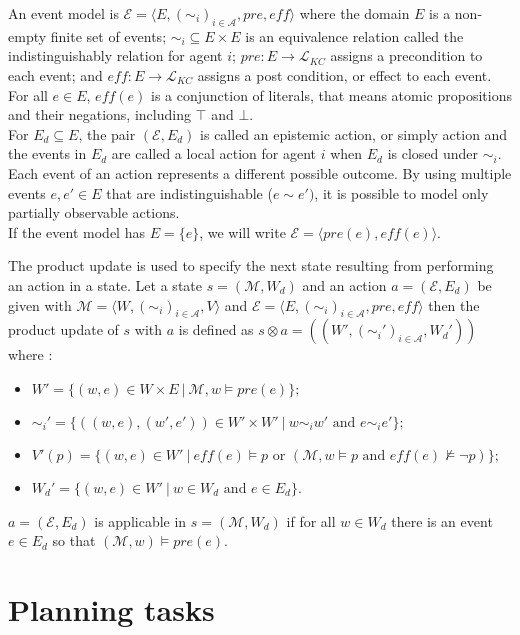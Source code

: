 An event model is $\mathcal{E} = \langle E, (\sim_i)_{i\in \mathcal{A}}, pre, \textit{eff}  \rangle$ where the domain $E$ is a non-empty finite set of events; $\sim_i \subseteq E \times E$ is an equivalence relation called the indistinguishably relation for agent $i$;
$pre:E \rightarrow \mathcal{L}_{KC}$ assigns a precondition to each event;
and $\textit{eff}:E \rightarrow \mathcal{L}_{KC}$ assigns a post condition, or effect to each event.
For all $e\in E$, $\textit{eff}(e)$ is a conjunction of literals, that means atomic propositions and their negations, including $\top$ and $\bot$.\\
For $E_d \subseteq E$, the pair $(\mathcal{E}, E_d)$ is called an epistemic action, or simply action and the events in $E_d$ are called a local action for agent $i$ when $E_d$ is closed under $\sim_i$. \\
Each event of an action represents a different possible outcome.
By using multiple events $e, e' \in E$ that are indistinguishable ($e \sim e' )$, it is possible to model only partially observable actions.\\
If the event model has $E=\{e\}$, we will write $\mathcal{E}=\langle pre(e), \textit{eff}(e)\rangle$.

The product update is used to specify the next state resulting from performing an action in a state.
Let a state $s = (\mathcal{M},W_d)$ and an action $a=(\mathcal{E},E_d)$ be given with $\mathcal{M}=\langle W,(\sim_i)_{i \in \mathcal{A}}, V\rangle $ and $\mathcal{E}=\langle E, (\sim_i)_{i \in \mathcal{A}},pre, \textit{eff} \rangle$
then the product update of $s$ with $a$ is defined as $s \otimes a = ((W',(\sim_i')_{i \in \mathcal{A}}, W_d'))$ where :
 \begin{itemize}
   \item $W'=\{(w,e)\in W \times E ~|~ \mathcal{M}, w \models pre(e)\};$
   \item $\sim_i'=\{((w,e),(w',e')) \in W'\times W' ~|~ w \sim_i w' \text{ and } e \sim_i e'\};$
   \item $V'(p) = \{ (w,e) \in W' ~|~ \textit{eff}(e) \models p \text{ or } (\mathcal{M},w \models p \text{ and } \textit{eff}(e)\not \models \neg p)\};$
   \item $W_d' = \{ (w,e) \in W' ~|~ w \in W_d \text{ and } e \in E_d\}$.
 \end{itemize}
$a=(\mathcal{E}, E_d)$ is applicable in $s=(\mathcal{M},W_d)$ if for all $w \in W_d$ there is an event $e \in E_d$ so that $(\mathcal{M},w) \models pre(e)$.

\section{Planning tasks}


